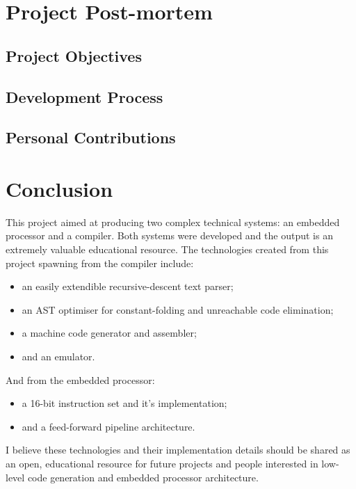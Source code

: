 \documentclass[11pt,a4paper]{report}
\begin{document}
\section{Project Post-mortem}

\subsection{Project Objectives}
\subsection{Development Process}
\subsection{Personal Contributions}




\section{Conclusion}
This project aimed at producing two complex technical systems: an embedded processor and a compiler. Both systems were developed and the output is an extremely valuable educational resource. The technologies created from this project spawning from the compiler include:
\begin{itemize}
\item{an easily extendible recursive-descent text parser;}
\item{an AST optimiser for constant-folding and unreachable code elimination;}
\item{a machine code generator and assembler;}
\item{and an emulator.}
\end{itemize}
And from the embedded processor:
\begin{itemize}
\item{a 16-bit instruction set and it's implementation;}
\item{and a feed-forward pipeline architecture.}
\end{itemize}
I believe these technologies and their implementation details should be shared as an open, educational resource for future projects and people interested in low-level code generation and embedded processor architecture.

\end{document}

